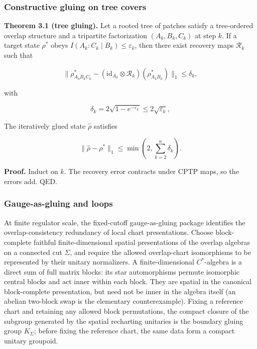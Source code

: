 \subsubsection{Constructive gluing on tree covers}\label{31-constructive-gluing-on-tree-covers}

\textbf{Theorem 3.1 (tree gluing).} Let a rooted tree of patches satisfy a tree-ordered overlap structure and a tripartite factorization \((A_k, B_k, C_k)\) at step \(k\). If a target state \(\rho^{\ast}\) obeys \(I(A_k:C_k \mid B_k) \le \varepsilon_k\), then there exist recovery maps \(\mathcal{R}_k\) such that

\[
\| \rho^{\ast}_{A_k B_k C_k} - (\mathrm{id}_{A_k} \otimes \mathcal{R}_k)(\rho^{\ast}_{A_k B_k}) \|_1
\le \delta_k,
\]

with

\[
\delta_k = 2\sqrt{1-e^{-\varepsilon_k}}
\le 2\sqrt{\varepsilon_k},
\]

The iteratively glued state \(\hat{\rho}\) satisfies

\[
\| \hat{\rho} - \rho^{\ast} \|_1 \le \min\left(2, \sum_{k=2}^n \delta_k\right).
\]

\textbf{Proof.} Induct on \(k\). The recovery error contracts under CPTP maps, so the errors add. QED.

\subsubsection{Gauge-as-gluing and loops}\label{32-gauge-as-gluing-and-loops}

At finite regulator scale, the fixed-cutoff gauge-as-gluing package identifies the overlap-consistency redundancy of local chart presentations. Choose block-complete faithful finite-dimensional spatial presentations of the overlap algebras on a connected cut \(\Sigma\), and require the allowed overlap-chart isomorphisms to be represented by their unitary normalizers. A finite-dimensional \(C^*\)-algebra is a direct sum of full matrix blocks: its star automorphisms permute isomorphic central blocks and act inner within each block. They are spatial in the canonical block-complete presentation, but need not be inner in the algebra itself (an abelian two-block swap is the elementary counterexample). Fixing a reference chart and retaining any allowed block permutations, the compact closure of the subgroup generated by the spatial recharting unitaries is the boundary gluing group \(K_\Sigma\); before fixing the reference chart, the same data form a compact unitary groupoid.

